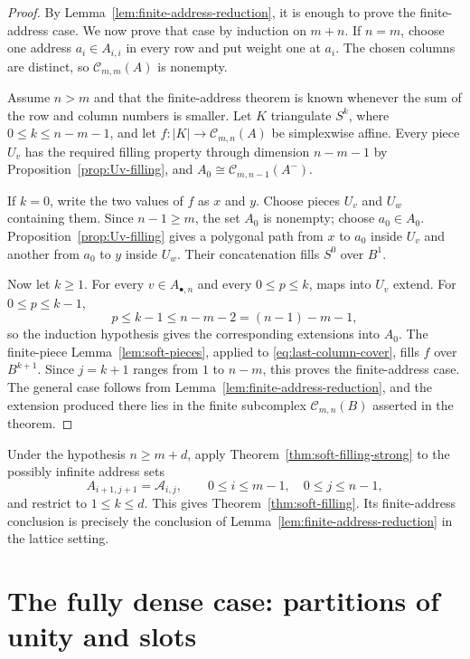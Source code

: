 \documentclass[11pt,reqno]{amsart}
\numberwithin{equation}{section}
\theoremstyle{definition}
\theoremstyle{remark}
\begin{document}
\begin{proof}
By Lemma~\ref{lem:finite-address-reduction}, it is enough to prove the
finite-address case.  We now prove that case by induction on $m+n$.  If
$n=m$, choose one address $a_i\in A_{i,i}$ in every row and put weight one
at $a_i$.  The chosen columns are distinct, so
$\mathcal C_{m,m}(A)$ is nonempty.

Assume $n>m$ and that the finite-address theorem is known whenever the sum of
the row and column numbers is smaller.  Let $K$ triangulate $S^k$, where
$0\le k\le n-m-1$, and let $f:|K|\to\mathcal C_{m,n}(A)$ be simplexwise
affine.  Every piece $U_v$ has the required filling property through
dimension $n-m-1$ by Proposition~\ref{prop:Uv-filling}, and
$A_0\cong\mathcal C_{m,n-1}(A^-)$.

If $k=0$, write the two values of $f$ as $x$ and $y$.  Choose pieces
$U_v$ and $U_w$ containing them.  Since $n-1\ge m$, the set $A_0$ is
nonempty; choose $a_0\in A_0$.  Proposition~\ref{prop:Uv-filling} gives a
polygonal path from $x$ to $a_0$ inside $U_v$ and another from $a_0$ to $y$
inside $U_w$.  Their concatenation fills $S^0$ over $B^1$.

Now let $k\ge1$.  For every $v\in A_{\bullet,n}$ and every $0\le p\le k$, maps into
$U_v$ extend.  For $0\le p\le k-1$,
\[
 p\le k-1\le n-m-2=(n-1)-m-1,
\]
so the induction hypothesis gives the corresponding extensions into $A_0$.
The finite-piece Lemma~\ref{lem:soft-pieces}, applied to
\eqref{eq:last-column-cover}, fills $f$ over $B^{k+1}$.  Since
$j=k+1$ ranges from $1$ to $n-m$, this proves the finite-address case.  The
general case follows from Lemma~\ref{lem:finite-address-reduction}, and the
extension produced there lies in the finite subcomplex
$\mathcal C_{m,n}(B)$ asserted in the theorem.
\end{proof}

Under the hypothesis $n\ge m+d$, apply
Theorem~\ref{thm:soft-filling-strong} to the possibly infinite address sets
\[
 A_{i+1,j+1}=\mathcal A_{i,j},
 \qquad 0\le i\le m-1,\quad 0\le j\le n-1,
\]
and restrict to $1\le k\le d$.  This gives
Theorem~\ref{thm:soft-filling}.  Its finite-address conclusion is precisely
the conclusion of Lemma~\ref{lem:finite-address-reduction} in the lattice
setting.


\section{The fully dense case: partitions of unity and slots}
\label{sec:fully-dense-case}
\end{document}

